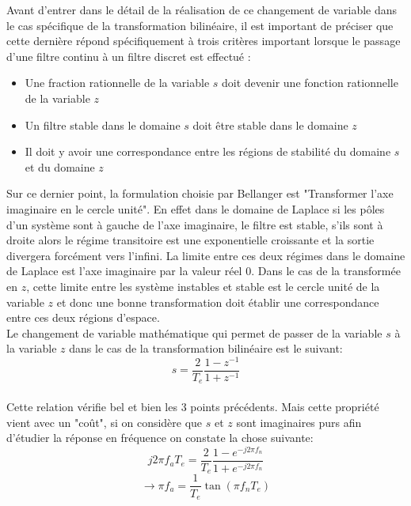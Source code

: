 \documentclass[11pt,a4paper]{article}
\begin{document}
Avant d'entrer dans le détail de la réalisation de ce changement de variable dans le cas spécifique de la transformation bilinéaire, il est important de préciser que cette dernière répond spécifiquement à trois critères important lorsque le passage d'une filtre continu à un filtre discret est effectué : \\

\begin{itemize}
\item Une fraction rationnelle de la variable $s$ doit devenir une fonction rationnelle de la variable $z$
\item Un filtre stable dans le domaine $s$ doit être stable dans le domaine $z$
\item Il doit y avoir une correspondance entre les régions de stabilité du domaine $s$ et du domaine $z$
\end{itemize}

Sur ce dernier point, la formulation choisie par Bellanger est "Transformer l’axe imaginaire en le cercle unité". En effet dans le domaine de Laplace si les pôles d'un système sont à gauche de l'axe imaginaire, le filtre est stable, s'ils sont à droite alors le régime transitoire est une exponentielle croissante et la sortie divergera forcément vers l'infini. La limite entre ces deux régimes dans le domaine de Laplace est l'axe imaginaire par la valeur réel 0. Dans le cas de la transformée en $z$, cette limite entre les système instables et stable est le cercle unité de la variable $z$ et donc une bonne transformation doit établir une correspondance entre ces deux régions d'espace.\\

Le changement de variable mathématique qui permet de passer de la variable $s$ à la variable $z$ dans le cas de la transformation bilinéaire est le suivant: \\

\[ s = \frac{2}{T_e} \frac{1-z^{-1}}{1+z^{-1}}\]\\

Cette relation vérifie bel et bien les 3 points précédents. Mais cette propriété vient avec un "coût", si on considère que $s$ et $z$ sont imaginaires purs afin d'étudier la réponse en fréquence on constate la chose suivante:\\

\[j2 \pi f_a T_e = \frac{2}{T_e} \frac{1-e^{-j2 \pi f_n}}{1+e^{-j2 \pi f_n}}\]
\[\rightarrow \pi f_a  = \frac{1}{T_e} \tan(\pi f_n T_e)\]\\
\end{document}
